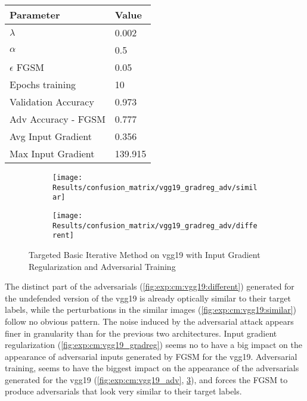 \documentclass[draft,final]{vutinfth} %
\begin{document}
\begin{table}[h]
  \centering
  \begin{tabular}{ll}
    \toprule
			Parameter			& Value   \\
    \midrule
			$\lambda$								& 0.002				\\
			$\alpha$								& 0.5					\\
			$\epsilon$ FGSM					& 0.05		\\
			Epochs training					& 10			\\
			
			Validation Accuracy			& 0.973		\\ 
			Adv Accuracy - FGSM			& 0.777		\\
			
			Avg Input Gradient			& 0.356	\\
			Max Input Gradient			& 139.915\\
    \bottomrule
  \end{tabular}
\end{table}


\begin{figure}[h]
  \begin{subfigure}[b]{0.5\columnwidth}
		\centering
    \texttt{[image: Results/confusion\_matrix/vgg19\_gradreg\_adv/similar]}
    \label{fig:exp:cm:vgg19_gradreg_adv:similar}
  \end{subfigure}
  \begin{subfigure}[b]{0.5\columnwidth}
		\centering
    \texttt{[image: Results/confusion\_matrix/vgg19\_gradreg\_adv/different]}
    \label{fig:exp:cm:vgg19_gradreg_adv:different}
  \end{subfigure}
  \caption{Targeted Basic Iterative Method on vgg19 with Input Gradient Regularization and Adversarial Training}
  \label{fig:exp:cm:vgg19_gradreg_adv}
\end{figure}

The distinct part of the adversarials (\ref{fig:exp:cm:vgg19:different}) generated for the undefended version of the vgg19 is already optically similar to their target labels, while the perturbations in the similar images (\ref{fig:exp:cm:vgg19:similar}) follow no obvious pattern.
The noise induced by the adversarial attack appears finer in granularity than for the previous two architectures.
Input gradient regularization (\ref{fig:exp:cm:vgg19_gradreg}) seems no to have a big impact on the appearance of adversarial inputs generated by FGSM for the vgg19.
Adversarial training, seems to have the biggest impact on the appearance of the adversarials generated for the vgg19 (\ref{fig:exp:cm:vgg19_adv}, \ref{fig:exp:cm:vgg19_gradreg_adv}), and forces the FGSM to produce adversarials that look very similar to their target labels.
\end{document}
